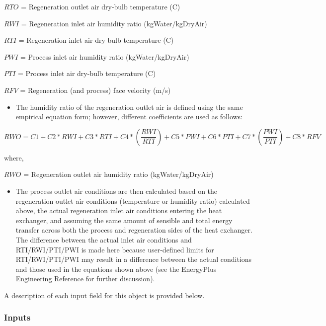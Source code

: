 \(RTO\) = Regeneration outlet air dry-bulb temperature (C)

\(RWI\) = Regeneration inlet air humidity ratio (kgWater/kgDryAir)

\(RTI\) = Regeneration inlet air dry-bulb temperature (C)

\(PWI\) = Process inlet air humidity ratio (kgWater/kgDryAir)

\(PTI\) = Process inlet air dry-bulb temperature (C)

\(RFV\) = Regeneration (and process) face velocity (m/s)

\begin{itemize}
\tightlist
\item
  The humidity ratio of the regeneration outlet air is defined using the same empirical equation form; however, different coefficients are used as follows:
\end{itemize}

\begin{equation}
RWO = C1 + C2*RWI + C3*RTI + C4*\left( {\frac{{RWI}}{{RTI}}} \right) + C5*PWI + C6*PTI + C7*\left( {\frac{{PWI}}{{PTI}}} \right) + C8*RFV
\end{equation}

where,

\(RWO\) = Regeneration outlet air humidity ratio (kgWater/kgDryAir)

\begin{itemize}
\tightlist
\item
  The process outlet air conditions are then calculated based on the regeneration outlet air conditions (temperature or humidity ratio) calculated above, the actual regeneration inlet air conditions entering the heat exchanger, and assuming the same amount of sensible and total energy transfer across both the process and regeneration sides of the heat exchanger. The difference between the actual inlet air conditions and RTI/RWI/PTI/PWI is made here because user-defined limits for RTI/RWI/PTI/PWI may result in a difference between the actual conditions and those used in the equations shown above (see the EnergyPlus Engineering Reference for further discussion).
\end{itemize}

A description of each input field for this object is provided below.

\subsubsection{Inputs}\label{inputs-3-016}

